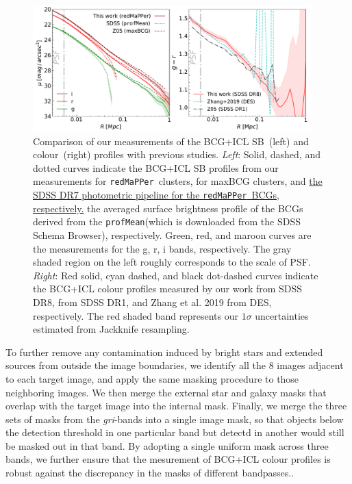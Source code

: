 \documentclass[fleqn,usenatbib]{mnras}
\newcommand\xkchen[1]{{\color{cyan} {#1}}}
\newcommand\redmapper{\texttt{redMaPPer}}
\begin{document}
\begin{figure}
    \centering\includegraphics[width=0.96\textwidth]{fig/total_sample_compare_to_Z05.pdf}
    \caption{Comparison of our measurements of the BCG+ICL SB~(left) and
    colour~(right) profiles with previous studies. {\it Left}: Solid,
    dashed, and dotted curves indicate the BCG+ICL SB profiles from our
    measurements for \redmapper~clusters,  for maxBCG clusters, and \xkchen{\uline{the SDSS DR7 photometric pipeline for the \redmapper~BCGs, respectively.} } \xkchen{the averaged surface brightness profile of the BCGs derived from the \texttt{profMean}\protect\footnotemark[2] (which is downloaded from the SDSS Schema Browser\protect\footnotemark[3]), respectively.}
    Green, red, and maroon curves are the measurements for the g, r, i
    bands, respectively. The gray shaded region on the left roughly
    corresponds to the scale of PSF. {\it Right}: Red solid, cyan dashed,
    and black dot-dashed curves indicate the BCG+ICL colour profiles
    measured by our work from SDSS DR8,  from SDSS DR1, and Zhang et al.
    2019 from DES, respectively.  The red shaded band represents our
    $1\sigma$ uncertainties estimated from Jackknife resampling.
    \label{fig:Z05_comparison} }
\end{figure}


To further remove any contamination induced by bright stars and extended
sources from outside the image boundaries, we identify all the \xkchen{8} images
adjacent to each target image, and apply the same masking procedure to
those neighboring images.  We then merge the external star and galaxy masks
that overlap with the target image into the internal mask. Finally, we
merge the three sets of masks from the {\it gri}-bands into a single image
mask, so that objects below the detection threshold in one particular band
but detectd in another would still be masked out in that band. By adopting
a single uniform mask across three bands, we further ensure that the
mesurement of BCG+ICL colour profiles is robust against the discrepancy in
the masks of different bandpasses..
\end{document}
